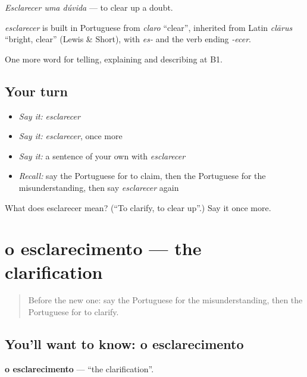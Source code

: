 \emph{Esclarecer uma dúvida} — to clear up a doubt.

\begin{cousinweb}
\emph{esclarecer} is built in Portuguese from \emph{claro} \textquotedblleft{}clear\textquotedblright{}, inherited from Latin \emph{clārus} \textquotedblleft{}bright, clear\textquotedblright{} (Lewis \& Short), with \emph{es-} and the verb ending \emph{-ecer}.
\end{cousinweb}

\begin{grammarlens}[title={What you've built}]
One more word for telling, explaining and describing at B1.
\end{grammarlens}

\subsection*{Your turn}
\begin{itemize}
\raggedright
  \item \emph{Say it:} \emph{esclarecer}
  \item \emph{Say it:} \emph{esclarecer}, once more
  \item \emph{Say it:} a sentence of your own with \emph{esclarecer}
  \item \emph{Recall:} say the Portuguese for to claim, then the Portuguese for the misunderstanding, then say \emph{esclarecer} again
\end{itemize}

\begin{tcolorbox}[breakable,colback=teal!4,colframe=teal!35!black,title={Before you move on}]
What does esclarecer mean? (\textquotedblleft{}To clarify, to clear up\textquotedblright{}.) Say it once more.
\end{tcolorbox}
\section[o esclarecimento]{o esclarecimento — the clarification}

\label{lesson:PT-C343-esclarecimento}



\begin{quote}
Before the new one: say the Portuguese for the misunderstanding, then the Portuguese for to clarify.
\end{quote}

\subsection*{You'll want to know: o esclarecimento}
\textbf{o esclarecimento} — \textquotedblleft{}the clarification\textquotedblright{}.

